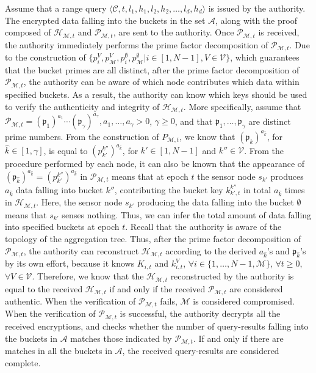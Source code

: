 \documentclass[conference]{IEEEtran}
\begin{document}
Assume that a range query $\langle \mathcal{C}, t, l_1, h_1, l_2, h_2, \dots, l_d, h_d\rangle$ is issued by the authority. The encrypted data falling into the buckets in the set $\mathcal{A}$, along with the proof composed of $\mathcal{H}_{\mathcal{M},t}$ and $\mathcal{P}_{\mathcal{M},t}$, are sent to the authority. Once $\mathcal{P}_{\mathcal{M},t}$ is received, the authority immediately performs the prime factor decomposition of $\mathcal{P}_{\mathcal{M},t}$. Due to the construction of $\{p_{i}^{V},p_{\mathcal{M}}^{V},p_{i}^{\emptyset},p_{\mathcal{M}}^{\emptyset}|i\in[1,N-1],V\in\mathcal{V}\}$, which guarantees that the bucket primes are all distinct, after the prime factor decomposition of $\mathcal{P}_{\mathcal{M},t}$, the authority can be aware of which node contributes which data within specified buckets. As a result, the authority can know which keys should be used to verify the authenticity and integrity of $\mathcal{H}_{\mathcal{M},t}$. More specifically, assume that $\mathcal{P}_{\mathcal{M},t}=(\mathfrak{p}_1)^{a_1}\cdots (\mathfrak{p}_\gamma)^{a_\gamma}, a_1,\dots,a_\gamma> 0$, $\gamma\geq 0$, and that $\mathfrak{p}_1,\dots,\mathfrak{p}_{\gamma}$ are distinct prime numbers. From the construction of $P_{\mathcal{M},t}$, we know that $(\mathfrak{p}_{\hat{k}})^{a_{\hat{k}}}$, for $\hat{k}\in[1,\gamma]$, is equal to $(p_{k'}^{k''})^{a_{\hat{k}}}$, for $k'\in[1,N-1]$ and $k''\in \mathcal{V}$. From the procedure performed by each node, it can also be known that the appearance of $(\mathfrak{p}_{\hat{k}})^{a_{\hat{k}}}=(p_{k'}^{k''})^{a_{\hat{k}}}$ in $\mathcal{P}_{\mathcal{M},t}$ means that at epoch $t$ the sensor node $s_{k'}$ produces $a_{\hat{k}}$ data falling into bucket $k''$, contributing the bucket key $k_{k',t}^{k''}$ in total $a_{\hat{k}}$ times in $\mathcal{H}_{\mathcal{M},t}$. Here, the sensor node $s_{k'}$ producing the data falling into the bucket $\emptyset$ means that $s_{k'}$ senses nothing. Thus, we can infer the total amount of data falling into specified buckets at epoch $t$. Recall that the authority is aware of the topology of the aggregation tree. Thus, after the prime factor decomposition of $\mathcal{P}_{\mathcal{M},t}$, the authority can reconstruct $\mathcal{H}_{\mathcal{M},t}$ according to the derived $a_{\hat{k}}$'s and $\mathfrak{p}_{\hat{k}}$'s by its own effort, because it knows $K_{i,t}$ and $k_{i,t}^V$, $\forall i\in\{1,\dots,N-1,\mathcal{M}\}$, $\forall t\geq 0$, $\forall V\in\mathcal{V}$. Therefore, we know that the $\mathcal{H}_{\mathcal{M},t}$ reconstructed by the authority is equal to the received $\mathcal{H}_{\mathcal{M},t}$ if and only if the received $\mathcal{P}_{\mathcal{M},t}$ are considered authentic. When the verification of $\mathcal{P}_{\mathcal{M},t}$ fails, $\mathcal{M}$ is considered compromised. When the verification of $\mathcal{P}_{\mathcal{M},t}$ is successful, the authority decrypts all the received encryptions, and checks whether the number of query-results falling into the buckets in $\mathcal{A}$ matches those indicated by $\mathcal{P}_{\mathcal{M},t}$. If and only if there are matches in all the buckets in $\mathcal{A}$, the received query-results are considered complete.
\end{document}
